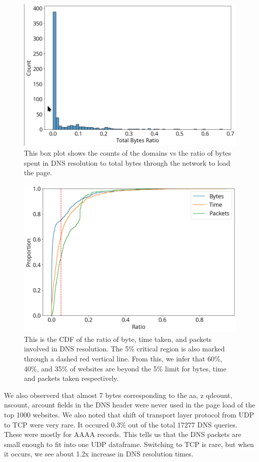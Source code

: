 \documentclass[conference]{IEEEtran}
\begin{document}
\begin{figure}[htbp]
    \centering
    \includegraphics[width=0.9\linewidth]{images/bytes-ratio.png}
    \caption{This box plot shows the counts of the domains vs the ratio of bytes spent in DNS resolution to total bytes through the network to load the page.}
    \label{fig:bytes-ratio}
\end{figure}

\begin{figure}[htbp]
    \centering
    \includegraphics[width=0.9\linewidth]{images/bytes-time-packets.png}
    \caption{This is the CDF of the ratio of byte, time taken, and packets involved in DNS resolution. The 5\% critical region is also marked through a dashed red vertical line. From this, we infer
    that 60\%, 40\%, and 35\% of websites are beyond the
    5\% limit for bytes, time and packets taken respectively.}
    \label{fig:bytes-time-packets}
\end{figure}

We also observerd that almost 7 bytes corresponding to the aa, z qdcount, nscount, arcount fields in the DNS header were never used in the page load of the top 1000 websites. We also noted that shift of transport layer protocol from UDP to TCP were very rare. It occured 0.3\% out of the total 17277 DNS queries. These were mostly for AAAA records. This tells us that the DNS packets are small enough to fit into one UDP dataframe. Switching to TCP is rare, but when it occurs, we see about 1.2x increase in DNS resolution times.
\end{document}
